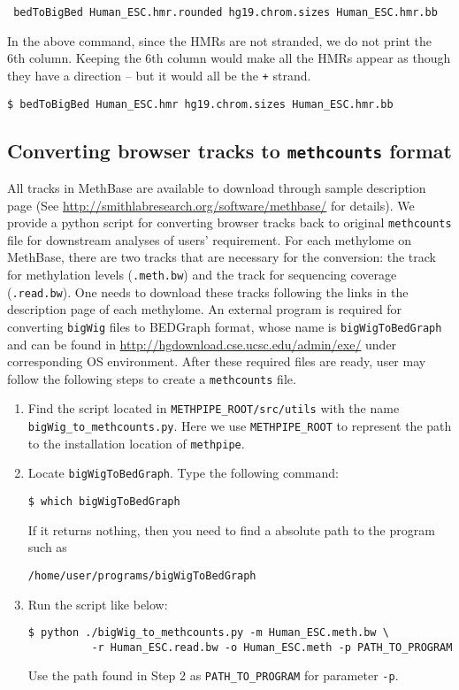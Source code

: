 \documentclass[10pt]{article}
\newcommand{\meth}{\texttt{methpipe}}
\newcommand{\lit}[1]{\texttt{#1}}
\begin{document}
{{\begin{enumerate}
\begin{verbatim}
 bedToBigBed Human_ESC.hmr.rounded hg19.chrom.sizes Human_ESC.hmr.bb
\end{verbatim}

  In the above command, since the HMRs are not stranded, we do not
  print the 6th column. Keeping the 6th column would make all the HMRs
  appear as though they have a direction -- but it would all be the
  \lit{+} strand.
\begin{verbatim}
$ bedToBigBed Human_ESC.hmr hg19.chrom.sizes Human_ESC.hmr.bb
\end{verbatim}
\end{enumerate}

\subsection{Converting browser tracks to \texttt{methcounts} format}
All tracks in MethBase are available to download through sample description
page (See \url{http://smithlabresearch.org/software/methbase/} for details). 
We provide a python script for converting browser tracks back to original
\texttt{methcounts} file for downstream analyses of users' requirement. For
each methylome on MethBase, there are two tracks that are necessary for
the conversion: the track for methylation levels (\texttt{.meth.bw}) and
the track for sequencing coverage (\texttt{.read.bw}). One needs to download
these tracks following the links in the description page of each methylome.
An external program is required for converting \texttt{bigWig} files to
BEDGraph format, whose name is \texttt{bigWigToBedGraph} and can be found
in \url{http://hgdownload.cse.ucsc.edu/admin/exe/} under corresponding
OS environment. After these required files are ready, user may follow the
following steps to create a \texttt{methcounts} file.

\begin{enumerate}
\item Find the script located in \texttt{METHPIPE\_ROOT/src/utils} with the
name \texttt{bigWig\_to\_methcounts.py}. Here we use
\texttt{METHPIPE\_ROOT} to represent the path to the installation location
of \meth.
\item Locate \texttt{bigWigToBedGraph}. Type the following command:
\begin{verbatim}
$ which bigWigToBedGraph
\end{verbatim}
If it returns nothing, then you need to find a absolute path to the 
program such as
\begin{verbatim}
/home/user/programs/bigWigToBedGraph
\end{verbatim}
\item Run the script like below:
\begin{verbatim}
$ python ./bigWig_to_methcounts.py -m Human_ESC.meth.bw \
          -r Human_ESC.read.bw -o Human_ESC.meth -p PATH_TO_PROGRAM
\end{verbatim}
Use the path found in Step 2 as \texttt{PATH\_TO\_PROGRAM} for parameter
\texttt{-p}.


\end{enumerate}}}
\end{document}
